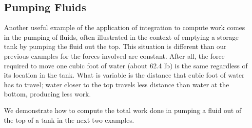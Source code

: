 \subsection{Pumping Fluids}


Another useful example of the application of integration to compute work comes in the pumping of fluids, often illustrated in the context of emptying a storage tank by pumping the fluid out the top. This situation is different than our previous examples for the forces involved are constant. After all, the force required to move one cubic foot of water (about 62.4 lb) is the same regardless of its location in the tank. What is variable is the distance that cubic foot of water has to travel; water closer to the top travels less distance than water at the bottom, producing less work.

We demonstrate how to compute the total work done in pumping a fluid out of the top of a tank in the next two examples.

